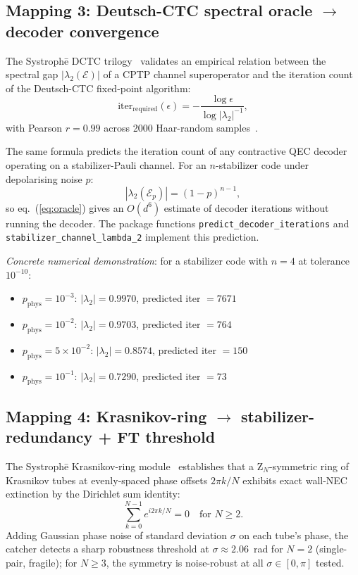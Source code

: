 \documentclass[11pt,a4paper]{article}
\begin{document}
\subsection{Mapping 3: Deutsch-CTC spectral oracle $\to$ decoder convergence}

The Systroph\=e DCTC trilogy~\cite{KnoppDrive} validates an empirical relation between the spectral gap $|\lambda_{2}(\mathcal{E})|$ of a CPTP channel superoperator and the iteration count of the Deutsch-CTC fixed-point algorithm:
\begin{equation}\label{eq:oracle}
\mathrm{iter}_{\mathrm{required}}(\epsilon) = -\frac{\log\epsilon}{\log|\lambda_{2}|^{-1}},
\end{equation}
with Pearson $r = 0.99$ across 2000 Haar-random samples~\cite{KnoppDrive}.

The same formula predicts the iteration count of any contractive QEC decoder operating on a stabilizer-Pauli channel. For an $n$-stabilizer code under depolarising noise $p$:
\begin{equation}
|\lambda_{2}(\mathcal{E}_{p})| = (1-p)^{n-1},
\end{equation}
so eq.~(\ref{eq:oracle}) gives an $O(d^{6})$ estimate of decoder iterations without running the decoder. The package functions \texttt{predict\_decoder\_iterations} and \texttt{stabilizer\_channel\_lambda\_2} implement this prediction.

\emph{Concrete numerical demonstration}: for a stabilizer code with $n=4$ at tolerance $10^{-10}$:
\begin{itemize}[leftmargin=*]
  \item $p_{\mathrm{phys}} = 10^{-3}$: $|\lambda_{2}| = 0.9970$, predicted iter $= 7671$
  \item $p_{\mathrm{phys}} = 10^{-2}$: $|\lambda_{2}| = 0.9703$, predicted iter $= 764$
  \item $p_{\mathrm{phys}} = 5\times10^{-2}$: $|\lambda_{2}| = 0.8574$, predicted iter $= 150$
  \item $p_{\mathrm{phys}} = 10^{-1}$: $|\lambda_{2}| = 0.7290$, predicted iter $= 73$
\end{itemize}

\subsection{Mapping 4: Krasnikov-ring $\to$ stabilizer-redundancy + FT threshold}

The Systroph\=e Krasnikov-ring module~\cite{SystropheRepo} establishes that a Z$_N$-symmetric ring of Krasnikov tubes at evenly-spaced phase offsets $2\pi k/N$ exhibits exact wall-NEC extinction by the Dirichlet sum identity:
\begin{equation}
\sum_{k=0}^{N-1} e^{i 2\pi k / N} = 0 \quad \text{for } N \ge 2.
\end{equation}
Adding Gaussian phase noise of standard deviation $\sigma$ on each tube's phase, the catcher detects a sharp robustness threshold at $\sigma \approx 2.06$~rad for $N = 2$ (single-pair, fragile); for $N \ge 3$, the symmetry is noise-robust at all $\sigma \in [0,\pi]$ tested.
\end{document}
